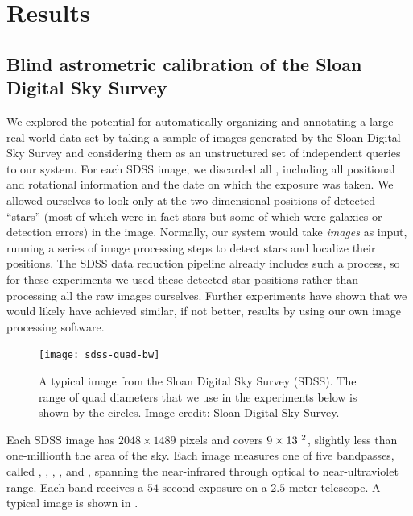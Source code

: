

\section{Results}

\subsection{Blind astrometric calibration of the Sloan Digital Sky Survey}

We explored the potential for automatically organizing and annotating
a large real-world data set by taking a sample of images generated by
the Sloan Digital Sky Survey and considering them as an unstructured
set of independent queries to our system.  For each SDSS image, we
discarded all \metadata, including all positional and rotational
information and the date on which the exposure was taken.  We allowed
ourselves to look only at the two-dimensional positions of detected
``stars'' (most of which were in fact stars but some of which were
galaxies or detection errors) in the image.  Normally, our system
would take \emph{images} as input, running a series of image
processing steps to detect stars and localize their positions.  The
SDSS data reduction pipeline already includes such a process, so for
these experiments we used these detected star positions rather than
processing all the raw images ourselves.  Further experiments have
shown that we would likely have achieved similar, if not better,
results by using our own image processing software.


\begin{figure}[htp]
\begin{center}
\texttt{[image: sdss-quad-bw]}
\end{center}
\caption{A typical image from the Sloan Digital Sky Survey (SDSS).
The range of quad diameters that we use in the experiments below is
shown by the circles.  Image credit: Sloan Digital Sky Survey.
\label{fig:sdss}}
\end{figure}


Each SDSS image has $2048\times1489$ pixels and covers
$9\times13~^2$, slightly less than one-millionth the area of
the sky.  Each image measures one of five bandpasses, called \uband,
\gband, \rband, \iband, and \zband, spanning the near-infrared through
optical to near-ultraviolet range.  Each band receives a $54$-second
exposure on a $2.5$-meter telescope.  A typical image is shown in
.


